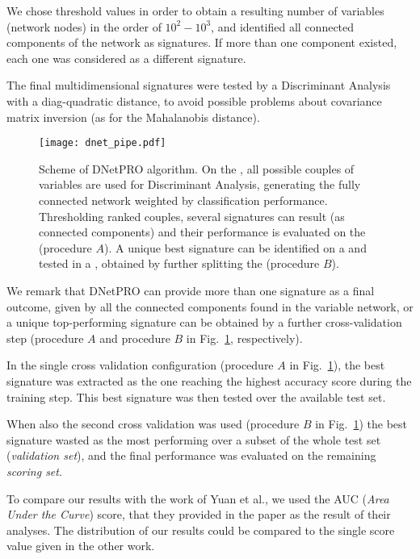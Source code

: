 \documentclass{standalone}
\begin{document}
We chose threshold values in order to obtain a resulting number of variables (network nodes) in the order of $10^2-10^3$, and identified all connected components of the network as signatures.
If more than one component existed, each one was considered as a different signature.

The final multidimensional signatures were tested by a Discriminant Analysis with a diag-quadratic distance, to avoid possible problems about covariance matrix inversion (as for the Mahalanobis distance).

\begin{center}
\begin{figure}[htbp]
\centering
\texttt{[image: dnet\_pipe.pdf]}
\caption{Scheme of \textsf{DNetPRO} algorithm.
On the , all possible couples of variables are used for Discriminant Analysis, generating the fully connected network weighted by classification performance.
Thresholding ranked couples, several signatures can result (as connected components) and their performance is evaluated on the  (procedure $A$).
A unique best signature can be identified on a  and tested in a , obtained by further splitting the  (procedure $B$).
}
\label{fig:dnet_pipe}
\end{figure}
\end{center}

We remark that \textsf{DNetPRO} can provide more than one signature as a final outcome, given by all the connected components found in the variable network, or a unique top-performing signature can be obtained by a further cross-validation step (procedure $A$ and procedure $B$ in Fig.~\ref{fig:dnet_pipe}, respectively).

In the single cross validation configuration (procedure $A$ in Fig.~\ref{fig:dnet_pipe}), the best signature was extracted as the one reaching the highest accuracy score during the training step.
This best signature was then tested over the available test set.

When also the second cross validation was used (procedure $B$ in Fig.~\ref{fig:dnet_pipe}) the best signature wasted as the most performing over a subset of the whole test set (\emph{validation set}), and the final performance was evaluated on the remaining \emph{scoring set}.

To compare our results with the work of Yuan et al., we used the AUC (\emph{Area Under the Curve}) score, that they provided in the paper as the result of their analyses.
The distribution of our results could be compared to the single score value given in the other work.
\end{document}
